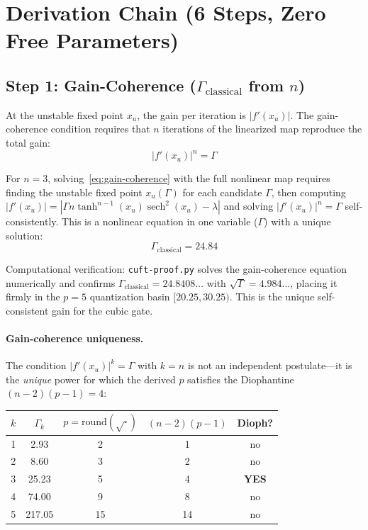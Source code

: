 \documentclass[12pt,a4paper]{article}
\theoremstyle{definition}
\begin{document}
\section{Derivation Chain (6 Steps, Zero Free Parameters)}

\subsection*{Step 1: Gain-Coherence ($\Gamma_\mathrm{classical}$ from $n$)}

At the unstable fixed point $x_u$, the gain per iteration is $|f'(x_u)|$.
The gain-coherence condition requires that $n$ iterations of the
linearized map reproduce the total gain:
\begin{equation}\label{eq:gain-coherence}
  |f'(x_u)|^n = \Gamma
\end{equation}

For $n = 3$, solving~\eqref{eq:gain-coherence} with the full nonlinear map
requires finding the unstable fixed point $x_u(\Gamma)$ for each candidate
$\Gamma$, then computing
$|f'(x_u)| = |\Gamma n \tanh^{n-1}(x_u)\operatorname{sech}^2(x_u) - \lambda|$
and solving $|f'(x_u)|^n = \Gamma$ self-consistently. This is a nonlinear
equation in one variable ($\Gamma$) with a unique solution:
\begin{equation}\label{eq:gamma-classical}
  \Gamma_\mathrm{classical} = 24.84
\end{equation}

Computational verification: \texttt{cuft-proof.py} solves the gain-coherence
equation numerically and confirms $\Gamma_\mathrm{classical} = 24.8408\ldots$
with $\sqrt{\Gamma} = 4.984\ldots$, placing it firmly in the $p = 5$
quantization basin $[20.25, 30.25)$. This is the unique self-consistent
gain for the cubic gate.

\paragraph{Gain-coherence uniqueness.}
The condition $|f'(x_u)|^k = \Gamma$ with $k = n$ is not an independent
postulate---it is the \emph{unique} power for which the derived $p$
satisfies the Diophantine $(n-2)(p-1) = 4$:

\begin{center}
\begin{tabular}{ccccc}
\toprule
$k$ & $\Gamma_k$ & $p = \mathrm{round}(\sqrt{\cdot})$ & $(n{-}2)(p{-}1)$ & Dioph? \\
\midrule
1 &   2.93 &  2 &  1 & no \\
2 &   8.60 &  3 &  2 & no \\
3 &  25.23 &  5 &  4 & \textbf{YES} \\
4 &  74.00 &  9 &  8 & no \\
5 & 217.05 & 15 & 14 & no \\
\bottomrule
\end{tabular}
\end{center}
\end{document}

